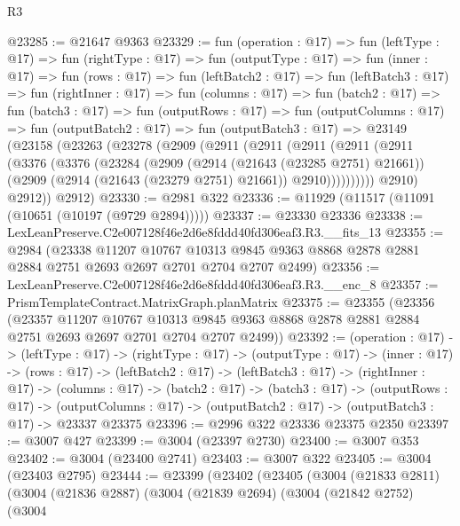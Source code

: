 \begin{lexlean}{R3}
\begin{coremodule}
@23285 := @21647 @9363
@23329 := fun (operation : @17) =>
  fun (leftType : @17) =>
  fun (rightType : @17) =>
  fun (outputType : @17) =>
  fun (inner : @17) =>
  fun (rows : @17) =>
  fun (leftBatch2 : @17) =>
  fun (leftBatch3 : @17) =>
  fun (rightInner : @17) =>
  fun (columns : @17) =>
  fun (batch2 : @17) =>
  fun (batch3 : @17) =>
  fun (outputRows : @17) =>
  fun (outputColumns : @17) =>
  fun (outputBatch2 : @17) =>
  fun (outputBatch3 : @17) =>
  @23149
    (@23158
      (@23263
        (@23278
          (@2909
            (@2911
              (@2911
                (@2911
                  (@2911
                    (@2911
                      (@3376
                        (@3376
                          (@23284
                            (@2909
                              (@2914 (@21643 (@23285 @2751) @21661))
                              (@2909 (@2914 (@21643 (@23279 @2751) @21661)) @2910))))))))))
            @2910)
          @2912))
      @2912)
@23330 := @2981 @322
@23336 := @11929 (@11517 (@11091 (@10651 (@10197 (@9729 @2894)))))
@23337 := @23330 @23336
@23338 := LexLeanPreserve.C2e007128f46e2d6e8fddd40fd306eaf3.R3.__fits_13
@23355 := @2984
    (@23338
      @11207
      @10767
      @10313
      @9845
      @9363
      @8868
      @2878
      @2881
      @2884
      @2751
      @2693
      @2697
      @2701
      @2704
      @2707
      @2499)
@23356 := LexLeanPreserve.C2e007128f46e2d6e8fddd40fd306eaf3.R3.__enc_8
@23357 := PrismTemplateContract.MatrixGraph.planMatrix
@23375 := @23355
    (@23356
      (@23357
        @11207
        @10767
        @10313
        @9845
        @9363
        @8868
        @2878
        @2881
        @2884
        @2751
        @2693
        @2697
        @2701
        @2704
        @2707
        @2499))
@23392 := (operation : @17) ->
  (leftType : @17) ->
  (rightType : @17) ->
  (outputType : @17) ->
  (inner : @17) ->
  (rows : @17) ->
  (leftBatch2 : @17) ->
  (leftBatch3 : @17) ->
  (rightInner : @17) ->
  (columns : @17) ->
  (batch2 : @17) ->
  (batch3 : @17) ->
  (outputRows : @17) ->
  (outputColumns : @17) -> (outputBatch2 : @17) -> (outputBatch3 : @17) -> @23337 @23375
@23396 := @2996 @322 @23336 @23375 @2350
@23397 := @3007 @427
@23399 := @3004 (@23397 @2730)
@23400 := @3007 @353
@23402 := @3004 (@23400 @2741)
@23403 := @3007 @322
@23405 := @3004 (@23403 @2795)
@23444 := @23399
    (@23402
      (@23405
        (@3004
          (@21833 @2811)
          (@3004
            (@21836 @2887)
            (@3004
              (@21839 @2694)
              (@3004
                (@21842 @2752)
                (@3004

\end{coremodule}
\end{lexlean}
